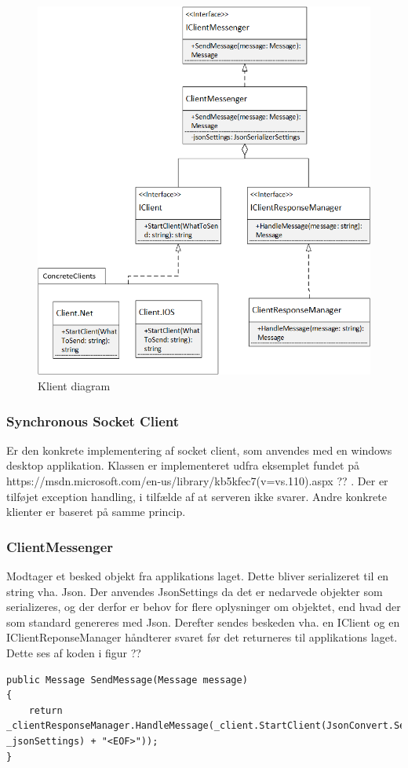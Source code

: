 \begin{figure}
	\centering
	\includegraphics[width=0.9\linewidth]{figs/connection/ConnectionClient.png}
	\caption{Klient diagram}
	\label{fig:ConnectionClient}
\end{figure}

\subsubsection{Synchronous Socket Client}
Er den konkrete implementering af socket client, som anvendes med en windows desktop applikation. Klassen er implementeret udfra eksemplet fundet på https://msdn.microsoft.com/en-us/library/kb5kfec7(v=vs.110).aspx ?? . Der er tilføjet exception handling, i tilfælde af at serveren ikke svarer. Andre konkrete klienter er baseret på samme princip.

\subsubsection{ClientMessenger}
Modtager et besked objekt fra applikations laget. Dette bliver serializeret til en string vha. Json. Der anvendes JsonSettings da det er nedarvede objekter som serializeres, og der derfor er behov for flere oplysninger om objektet, end hvad der som standard genereres med Json. Derefter sendes beskeden vha. en IClient og en IClientReponseManager håndterer svaret før det returneres til applikations laget. Dette ses af koden i figur ??
\begin{lstlisting}[caption=Client.SendMessage, label=code:Client.SendMessage]
public Message SendMessage(Message message)
{
	return _clientResponseManager.HandleMessage(_client.StartClient(JsonConvert.SerializeObject(message, _jsonSettings) + "<EOF>"));
}
\end{lstlisting}

